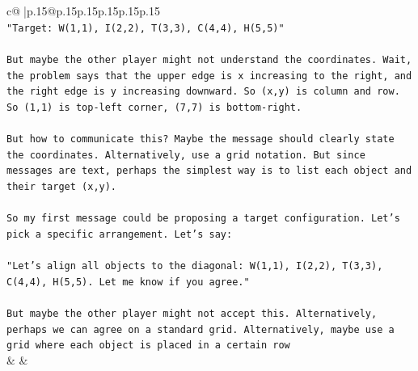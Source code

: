 \documentclass{article}
\begin{document}
{\begin{supertabular}{c@{$\;$}|p{.15\linewidth}@{}p{.15\linewidth}p{.15\linewidth}p{.15\linewidth}p{.15\linewidth}p{.15\linewidth}}
{{{\\ 
\texttt{"Target: W(1,1), I(2,2), T(3,3), C(4,4), H(5,5)"} \\
\\ 
\texttt{But maybe the other player might not understand the coordinates. Wait, the problem says that the upper edge is x increasing to the right, and the right edge is y increasing downward. So (x,y) is column and row. So (1,1) is top{-}left corner, (7,7) is bottom{-}right.} \\
\\ 
\texttt{But how to communicate this? Maybe the message should clearly state the coordinates. Alternatively, use a grid notation. But since messages are text, perhaps the simplest way is to list each object and their target (x,y).} \\
\\ 
\texttt{So my first message could be proposing a target configuration. Let's pick a specific arrangement. Let's say:} \\
\\ 
\texttt{"Let's align all objects to the diagonal: W(1,1), I(2,2), T(3,3), C(4,4), H(5,5). Let me know if you agree."} \\
\\ 
\texttt{But maybe the other player might not accept this. Alternatively, perhaps we can agree on a standard grid. Alternatively, maybe use a grid where each object is placed in a certain row} \\
            }
        }
    }
    & & \\ \\


\end{supertabular}}
\end{document}
